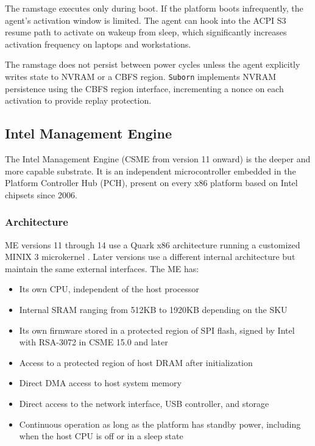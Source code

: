 \documentclass[11pt,a4paper]{article}
\begin{document}
The ramstage executes only during boot. If the platform boots infrequently, the agent's activation window is limited. The agent can hook into the ACPI S3 resume path to activate on wakeup from sleep, which significantly increases activation frequency on laptops and workstations.

The ramstage does not persist between power cycles unless the agent explicitly writes state to NVRAM or a CBFS region. \texttt{Suborn} implements NVRAM persistence using the CBFS region interface, incrementing a nonce on each activation to provide replay protection.

\subsection{Intel Management Engine}

The Intel Management Engine (CSME from version 11 onward) is the deeper and more capable substrate. It is an independent microcontroller embedded in the Platform Controller Hub (PCH), present on every x86 platform based on Intel chipsets since 2006.

\subsubsection{Architecture}

ME versions 11 through 14 use a Quark x86 architecture running a customized MINIX 3 microkernel \cite{eclypsium-me}. Later versions use a different internal architecture but maintain the same external interfaces. The ME has:

\begin{itemize}[noitemsep]
\item Its own CPU, independent of the host processor
\item Internal SRAM ranging from 512KB to 1920KB depending on the SKU \cite{intel-csme-whitepaper}
\item Its own firmware stored in a protected region of SPI flash, signed by Intel with RSA-3072 in CSME 15.0 and later
\item Access to a protected region of host DRAM after initialization
\item Direct DMA access to host system memory
\item Direct access to the network interface, USB controller, and storage
\item Continuous operation as long as the platform has standby power, including when the host CPU is off or in a sleep state
\end{itemize}
\end{document}
